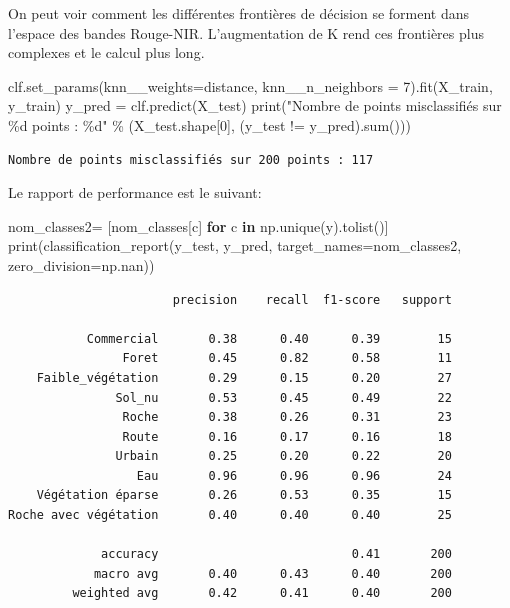 \documentclass[
]{article}
\newenvironment{Shaded}{}{}
\newcommand{\BuiltInTok}[1]{\textcolor[rgb]{0.00,0.50,0.00}{#1}}
\newcommand{\ControlFlowTok}[1]{\textcolor[rgb]{0.00,0.44,0.13}{\textbf{#1}}}
\newcommand{\DecValTok}[1]{\textcolor[rgb]{0.25,0.63,0.44}{#1}}
\newcommand{\KeywordTok}[1]{\textcolor[rgb]{0.00,0.44,0.13}{\textbf{#1}}}
\newcommand{\NormalTok}[1]{#1}
\newcommand{\OperatorTok}[1]{\textcolor[rgb]{0.40,0.40,0.40}{#1}}
\newcommand{\SpecialCharTok}[1]{\textcolor[rgb]{0.25,0.44,0.63}{#1}}
\newcommand{\StringTok}[1]{\textcolor[rgb]{0.25,0.44,0.63}{#1}}
\begin{document}
On peut voir comment les différentes frontières de décision se forment
dans l'espace des bandes Rouge-NIR. L'augmentation de K rend ces
frontières plus complexes et le calcul plus long.

\label{79cf2554}
\label{cb29}
\begin{Shaded}
\begin{Highlighting}[]
\NormalTok{clf.set\_params(knn\_\_weights}\OperatorTok{=}\StringTok{\textquotesingle{}distance\textquotesingle{}}\NormalTok{, knn\_\_n\_neighbors }\OperatorTok{=} \DecValTok{7}\NormalTok{).fit(X\_train, y\_train)}
\NormalTok{y\_pred }\OperatorTok{=}\NormalTok{ clf.predict(X\_test)}
\BuiltInTok{print}\NormalTok{(}\StringTok{"Nombre de points misclassifiés sur }\SpecialCharTok{\%d}\StringTok{ points : }\SpecialCharTok{\%d}\StringTok{"}
  \OperatorTok{\%}\NormalTok{ (X\_test.shape[}\DecValTok{0}\NormalTok{], (y\_test }\OperatorTok{!=}\NormalTok{ y\_pred).}\BuiltInTok{sum}\NormalTok{()))}
\end{Highlighting}
\end{Shaded}

\begin{verbatim}
Nombre de points misclassifiés sur 200 points : 117
\end{verbatim}

Le rapport de performance est le suivant:

\label{f1ec55f2}
\label{cb31}
\begin{Shaded}
\begin{Highlighting}[]
\NormalTok{nom\_classes2}\OperatorTok{=}\NormalTok{ [nom\_classes[c] }\ControlFlowTok{for}\NormalTok{ c }\KeywordTok{in}\NormalTok{ np.unique(y).tolist()]}
\BuiltInTok{print}\NormalTok{(classification\_report(y\_test, y\_pred, target\_names}\OperatorTok{=}\NormalTok{nom\_classes2, zero\_division}\OperatorTok{=}\NormalTok{np.nan))}
\end{Highlighting}
\end{Shaded}

\begin{verbatim}
                       precision    recall  f1-score   support

           Commercial       0.38      0.40      0.39        15
                Foret       0.45      0.82      0.58        11
    Faible_végétation       0.29      0.15      0.20        27
               Sol_nu       0.53      0.45      0.49        22
                Roche       0.38      0.26      0.31        23
                Route       0.16      0.17      0.16        18
               Urbain       0.25      0.20      0.22        20
                  Eau       0.96      0.96      0.96        24
    Végétation éparse       0.26      0.53      0.35        15
Roche avec végétation       0.40      0.40      0.40        25

             accuracy                           0.41       200
            macro avg       0.40      0.43      0.40       200
         weighted avg       0.42      0.41      0.40       200
\end{verbatim}
\end{document}
